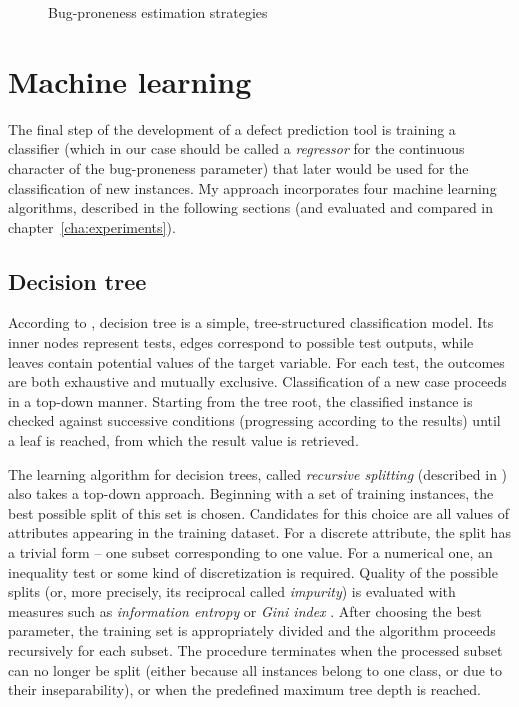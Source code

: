 \documentclass{pracamgr}
\begin{document}
\begin{figure}[H]
\centering

\caption{Bug-proneness estimation strategies}
\label{fig:bug_proneness_strategies}
\end{figure}

\section{Machine learning}
\label{sec:machine_learning}
The final step of the development of a defect prediction tool is training a classifier (which in our case should be called a \emph{regressor} for the continuous character of the bug-proneness parameter) that later would be used for the classification of new instances. My approach incorporates four machine learning algorithms, described in the following sections (and evaluated and compared in chapter~\ref{cha:experiments}).

\subsection{Decision tree}
\label{sec:decision_tree}
According to \cite[p. 263]{encyclopedia}, decision tree is a simple, tree-structured classification model. Its inner nodes represent tests, edges correspond to possible test outputs, while leaves contain potential values of the target variable. For each test, the outcomes are both exhaustive and mutually exclusive. Classification of a new case proceeds in a top-down manner. Starting from the tree root, the classified instance is checked against successive conditions (progressing according to the results) until a leaf is reached, from which the result value is retrieved.

The learning algorithm for decision trees, called \emph{recursive splitting} (described in \cite[p.~264]{encyclopedia}) also takes a top-down approach. Beginning with a set of training instances, the best possible split of this set is chosen. Candidates for this choice are all values of attributes appearing in the training dataset. For a discrete attribute, the split has a trivial form -- one subset corresponding to one value. For a numerical one, an inequality test or some kind of discretization is required. Quality of the possible splits (or, more precisely, its reciprocal called \emph{impurity}) is evaluated with measures such as \emph{information entropy} \cite{Shannon} or \emph{Gini index} \cite{Gini}. After choosing the best parameter, the training set is appropriately divided and the algorithm proceeds recursively for each subset. The procedure terminates when the processed subset can no longer be split (either because all instances belong to one class, or due to their inseparability), or when the predefined maximum tree depth is reached.
\end{document}
